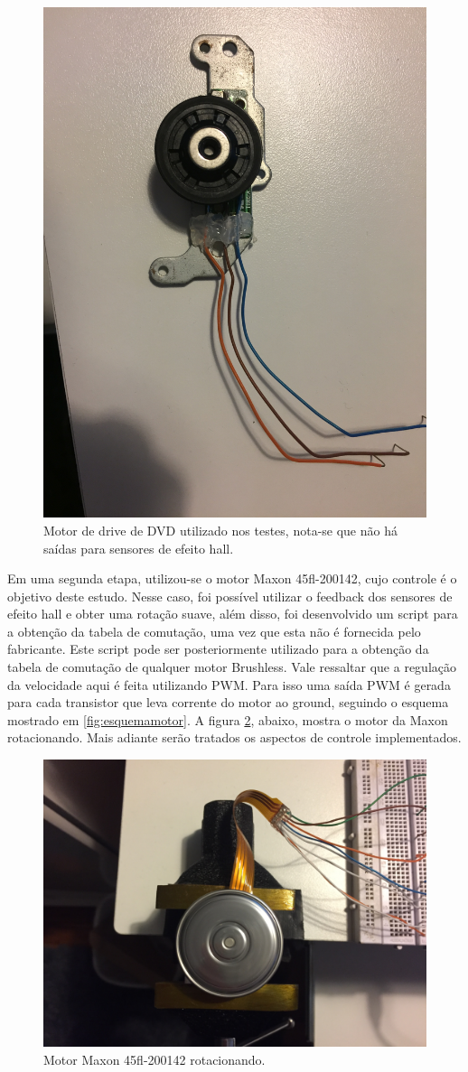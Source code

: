 \documentclass[a4paper,11pt]{article}
\begin{document}
		\begin{figure}[ht]
			\centering
			\includegraphics[width=0.5\linewidth]{images/motorantigo}
			\caption{Motor de drive de DVD utilizado nos testes, nota-se que não há saídas para sensores de efeito hall.}
			\label{fig:motorantigo}
		\end{figure}
	
		\newpage
		
		Em uma segunda etapa, utilizou-se o motor Maxon 45fl-200142, cujo controle é o objetivo deste estudo. Nesse caso, foi possível utilizar o feedback dos sensores de efeito hall e obter uma rotação suave, além disso, foi desenvolvido um script para a obtenção da tabela de comutação, uma vez que esta não é fornecida pelo fabricante. Este script pode ser posteriormente utilizado para a obtenção da tabela de comutação de qualquer motor Brushless. Vale ressaltar que a regulação da velocidade aqui é feita utilizando PWM. Para isso uma saída PWM é gerada para cada transistor que leva corrente do motor ao ground, seguindo o esquema mostrado em \ref{fig:esquemamotor}.
		A figura \ref{fig:motornovo}, abaixo, mostra o motor da Maxon rotacionando. Mais adiante serão tratados os aspectos de controle implementados.
		
		\begin{figure}[ht]
			\centering
			\includegraphics[width=0.5\linewidth]{images/motornovo}
			\caption{Motor Maxon 45fl-200142 rotacionando.}
			\label{fig:motornovo}
		\end{figure}
	
\end{document}
